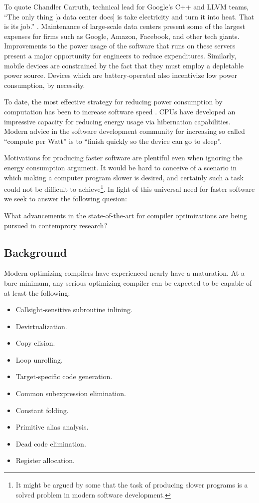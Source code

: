 \documentclass[nobib]{tufte-handout}
\begin{document}
To quote Chandler Carruth, technical lead for Google's C++ and LLVM teams, ``The only thing [a data center does] is take electricity and turn it into heat.  That is its job.'' \cite{Carruth}.  Maintenance of large-scale data centers present some of the largest expenses for firms such as Google, Amazon, Facebook, and other tech giants.  Improvements to the power usage of the software that runs on these servers present a major opportunity for engineers to reduce expenditures.  Similarly, mobile devices are constrained by the fact that they must employ a depletable power source.  Devices which are battery-operated also incentivize low power consumption, by necessity.

To date, the most effective strategy for reducing power consumption by computation has been to increase software speed \cite{Carruth}.  CPUs have developed an impressive capacity for reducing energy usage via hibernation capabilities.  Modern advice in the software development community for increasing so called ``compute per Watt'' is to ``finish quickly so the device can go to sleep''.

Motivations for producing faster software are plentiful even when ignoring the energy consumption argument.  It would be hard to conceive of a scenario in which making a computer program slower is desired, and certainly such a task could not be difficult to achieve\footnote{It might be argued by some that the task of producing slower programs is a solved problem in modern software development.}.  In light of this universal need for faster software we seek to answer the following quesion:

\begin{displayquote}
What advancements in the state-of-the-art for compiler optimizations are being pursued in contemprory research?
\end{displayquote}




\subsection{Background}
Modern optimizing compilers have experienced nearly have a maturation.  At a bare minimum, any serious optimizing compiler can be expected to be capable of at least the following:
\begin{itemize}
\item Callsight-sensitive subroutine inlining.
\item Devirtualization. 
\item Copy elision.
\item Loop unrolling. 
\item Target-specific code generation.  
\item Common subexpression elimination.
\item Constant folding.
\item Primitive alias analysis. 
\item Dead code elimination.
\item Register allocation.
\end{itemize}
\end{document}
